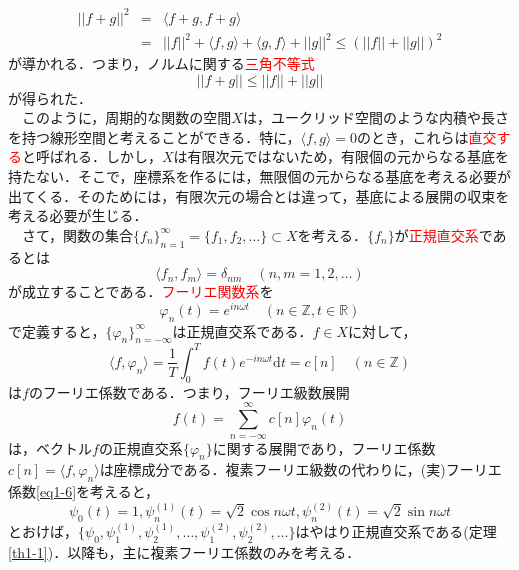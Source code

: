 \documentclass[a4j]{jsbook}
\numberwithin{theorem}{chapter}  %
\begin{document}
\begin{eqnarray*}
||f+g||^2&=&\langle f+g, f+g\rangle \\
&=&||f||^2+\langle f, g\rangle+\langle g, f\rangle+||g||^2\leq\left(||f||+||g||\right)^2
\end{eqnarray*}
が導かれる．つまり，ノルムに関する\textcolor{red}{三角不等式}
\begin{equation}
    ||f+g||\leq ||f||+||g|| \label{eq1-19}
\end{equation}
が得られた．\\
　このように，周期的な関数の空間\(X\)は，ユークリッド空間のような内積や長さを持つ線形空間と考えることができる．特に，\(\langle f, g\rangle=0\)のとき，これらは\textcolor{red}{直交する}と呼ばれる．しかし，\(X\)は有限次元ではないため，有限個の元からなる基底を持たない．そこで，座標系を作るには，無限個の元からなる基底を考える必要が出てくる．そのためには，有限次元の場合とは違って，基底による展開の収束を考える必要が生じる．\\
　さて，関数の集合\(\{f_n\}_{n=1}^\infty=\{f_1, f_2, \dots\}\subset X\)を考える．\(\{f_n\}\)が\textcolor{red}{正規直交系}であるとは
\begin{equation*}
    \langle f_n, f_m\rangle=\delta_{nm}\quad (n, m=1, 2, \dots)
\end{equation*}
が成立することである．\textcolor{red}{フーリエ関数系}を
\begin{equation*}
    \varphi_n(t)=e^{in\omega t}\quad (n\in\mathbb{Z}, t\in\mathbb{R})
\end{equation*}
で定義すると，\(\{\varphi_n\}_{n=-\infty}^\infty\)は正規直交系である．\(f\in X\)に対して，
\begin{equation*}
    \langle f, \varphi_n\rangle=\frac{1}{T}\int_0^T f(t)e^{-in\omega t}\mathrm{d}t=c[n]\quad (n\in\mathbb{Z})
\end{equation*}
は\(f\)のフーリエ係数である．つまり，フーリエ級数展開
\begin{equation*}
    f(t)=\sum_{n=-\infty}^\infty c[n]\varphi_n(t)
\end{equation*}
は，ベクトル\(f\)の正規直交系\(\{\varphi_n\}\)に関する展開であり，フーリエ係数\(c[n]=\langle f, \varphi_n\rangle\)は座標成分である．複素フーリエ級数の代わりに，(実)フーリエ係数\eqref{eq1-6}を考えると，
\begin{equation*}
    \psi_0(t)=1, \psi_n^{(1)}(t)=\sqrt{2}\cos n\omega t, \psi_n^{(2)}(t)=\sqrt{2}\sin n\omega t
\end{equation*}
とおけば，\(\{\psi_0, \psi_1^{(1)}, \psi_2^{(1)}, \dots, \psi_1^{(2)}, \psi_2^{(2)}, \dots\}\)はやはり正規直交系である(定理\ref{th1-1})．以降も，主に複素フーリエ係数のみを考える．
\end{document}
